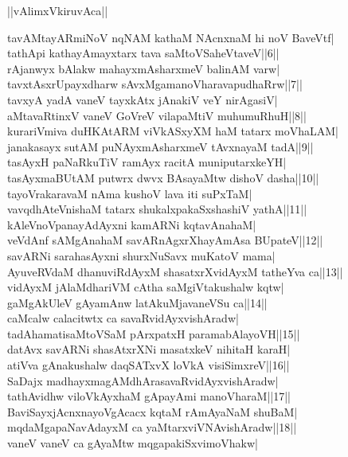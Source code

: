\documentclass{article}
\begin{document}
\begin{center}
||vAlimxVkiruvAca||
\end{center}

tavAMtayARmiNoV nqNAM kathaM NAcnxnaM hi noV BaveVtf|\\
tathApi kathayAmayxtarx tava saMtoVSaheVtaveV||6||\\
rAjanwyx bAlakw mahayxmAsharxmeV balinAM varw|\\
tavxtAsxrUpayxdharw sAvxMgamanoVharavapudhaRrw||7||\\
tavxyA yadA vaneV tayxkAtx jAnakiV veY nirAgasiV|\\
aMtavaRtinxV vaneV GoVreV vilapaMtiV muhumuRhuH||8||\\
kurariVmiva duHKAtARM viVkASxyXM haM tatarx moVhaLAM|\\
janakasayx sutAM puNAyxmAsharxmeV tAvxnayaM tadA||9||\\
tasAyxH paNaRkuTiV ramAyx racitA muniputarxkeYH|\\
tasAyxmaBUtAM putwrx dwvx BAsayaMtw dishoV dasha||10||\\
tayoVrakaravaM nAma kushoV lava iti suPxTaM|\\
vavqdhAteVnishaM tatarx shukalxpakaSxshashiV yathA||11||\\
kAleVnoVpanayAdAyxni kamARNi kqtavAnahaM|\\
veVdAnf sAMgAnahaM savARnAgxrXhayAmAsa BUpateV||12||\\
savARNi sarahasAyxni shurxNuSavx muKatoV mama|\\
AyuveRVdaM dhanuviRdAyxM shasatxrXvidAyxM tatheYva ca||13||\\
vidAyxM jAlaMdhariVM cAtha saMgiVtakushalw kqtw|\\
gaMgAkUleV gAyamAnw latAkuMjavaneVSu ca||14||\\
caMcalw calacitwtx ca savaRvidAyxvishAradw|\\
tadAhamatisaMtoVSaM pArxpatxH paramabAlayoVH||15||\\
datAvx savARNi shasAtxrXNi masatxkeV nihitaH karaH|\\
atiVva gAnakushalw daqSATxvX loVkA visiSimxreV||16||\\
SaDajx madhayxmagAMdhArasavaRvidAyxvishAradw|\\
tathAvidhw viloVkAyxhaM gApayAmi manoVharaM||17||\\
BaviSayxjAcnxnayoVgAcacx kqtaM rAmAyaNaM shuBaM|\\
mqdaMgapaNavAdayxM ca yaMtarxviVNAvishAradw||18||\\
vaneV vaneV ca gAyaMtw mqgapakiSxvimoVhakw|\\
\end{document}
